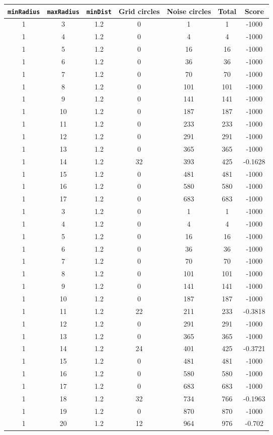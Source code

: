 \documentclass[letterpaper, 12pt]{article}
\begin{document}
\begin{longtable}{|c|c|c|c|c|c|c|}
\hline
\textbf{\texttt{minRadius}} & \textbf{\texttt{maxRadius}} & \textbf{\texttt{minDist}} & \textbf{Grid circles} & \textbf{Noise circles} & \textbf{Total} & \textbf{Score} \\
\hline
1 & 3 & 1.2 & 0 & 1 & 1 & -1000 \\
\hline
1 & 4 & 1.2 & 0 & 4 & 4 & -1000 \\
\hline
1 & 5 & 1.2 & 0 & 16 & 16 & -1000 \\
\hline
1 & 6 & 1.2 & 0 & 36 & 36 & -1000 \\
\hline
1 & 7 & 1.2 & 0 & 70 & 70 & -1000 \\
\hline
1 & 8 & 1.2 & 0 & 101 & 101 & -1000 \\
\hline
1 & 9 & 1.2 & 0 & 141 & 141 & -1000 \\
\hline
1 & 10 & 1.2 & 0 & 187 & 187 & -1000 \\
\hline
1 & 11 & 1.2 & 0 & 233 & 233 & -1000 \\
\hline
1 & 12 & 1.2 & 0 & 291 & 291 & -1000 \\
\hline
1 & 13 & 1.2 & 0 & 365 & 365 & -1000 \\
\hline
1 & 14 & 1.2 & 32 & 393 & 425 & -0.1628 \\
\hline
1 & 15 & 1.2 & 0 & 481 & 481 & -1000 \\
\hline
1 & 16 & 1.2 & 0 & 580 & 580 & -1000 \\
\hline
1 & 17 & 1.2 & 0 & 683 & 683 & -1000 \\
\hline
1 & 3 & 1.2 & 0 & 1 & 1 & -1000 \\
\hline
1 & 4 & 1.2 & 0 & 4 & 4 & -1000 \\
\hline
1 & 5 & 1.2 & 0 & 16 & 16 & -1000 \\
\hline
1 & 6 & 1.2 & 0 & 36 & 36 & -1000 \\
\hline
1 & 7 & 1.2 & 0 & 70 & 70 & -1000 \\
\hline
1 & 8 & 1.2 & 0 & 101 & 101 & -1000 \\
\hline
1 & 9 & 1.2 & 0 & 141 & 141 & -1000 \\
\hline
1 & 10 & 1.2 & 0 & 187 & 187 & -1000 \\
\hline
1 & 11 & 1.2 & 22 & 211 & 233 & -0.3818 \\
\hline
1 & 12 & 1.2 & 0 & 291 & 291 & -1000 \\
\hline
1 & 13 & 1.2 & 0 & 365 & 365 & -1000 \\
\hline
1 & 14 & 1.2 & 24 & 401 & 425 & -0.3721 \\
\hline
1 & 15 & 1.2 & 0 & 481 & 481 & -1000 \\
\hline
1 & 16 & 1.2 & 0 & 580 & 580 & -1000 \\
\hline
1 & 17 & 1.2 & 0 & 683 & 683 & -1000 \\
\hline
1 & 18 & 1.2 & 32 & 734 & 766 & -0.1963 \\
\hline
1 & 19 & 1.2 & 0 & 870 & 870 & -1000 \\
\hline
1 & 20 & 1.2 & 12 & 964 & 976 & -0.702 \\
\hline
\end{longtable}
\end{document}
